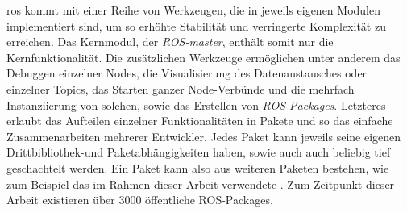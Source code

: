 \gls{ros} kommt mit einer Reihe von Werkzeugen, die in jeweils eigenen Modulen implementiert sind, um so erhöhte Stabilität und verringerte Komplexität zu erreichen. Das Kernmodul, der \textit{ROS-master}, enthält somit nur die Kernfunktionalität. Die zusätzlichen Werkzeuge ermöglichen unter anderem das Debuggen einzelner Nodes, die Visualisierung des Datenaustausches oder einzelner Topics, das Starten ganzer Node-Verbünde und die mehrfach Instanziierung von solchen, sowie das Erstellen von \textit{ROS-Packages}. Letzteres erlaubt das Aufteilen einzelner Funktionalitäten in Pakete und so das einfache Zusammenarbeiten mehrerer Entwickler. Jedes Paket kann jeweils seine eigenen Drittbibliothek-und Paketabhängigkeiten haben, sowie auch auch beliebig tief geschachtelt werden. Ein Paket kann also aus weiteren Paketen bestehen, wie zum Beispiel das im Rahmen dieser Arbeit verwendete \robosherlock. Zum Zeitpunkt dieser Arbeit existieren über 3000 öffentliche ROS-Packages.   

